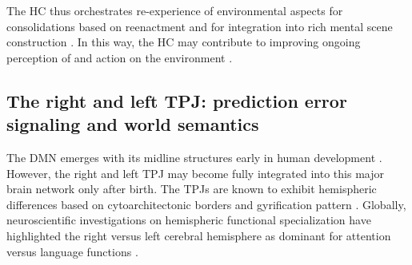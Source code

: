 \documentclass[10pt,letterpaper]{article}
\begin{document}
The HC thus orchestrates re-experience of environmental aspects for
consolidations based on reenactment and for integration into
rich mental scene construction \citep{deuker2016event, bird2010establishing}.
In this way, the HC may contribute to improving
ongoing perception of and action on the environment
\citep{maguire2016, lavilleon2015}.


\subsection{The right and left TPJ: prediction error signaling and world semantics}
The DMN emerges with its midline structures early in human development
\citep{doria2010}.
However,
the right and left TPJ may become fully integrated into this major brain
network only after birth.
The TPJs are known to exhibit hemispheric differences
based on cytoarchitectonic borders and gyrification pattern
\citep{seghier2013angular}.
Globally, neuroscientific investigations on hemispheric functional specialization
have highlighted the right versus left cerebral hemisphere as dominant for
attention versus language functions
\citep{seghier2013angular, bzdok2013tpj, bzdok2016left}.
\end{document}
